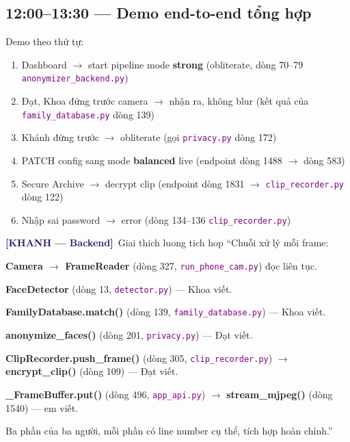 \documentclass[12pt, a4paper]{article}
\newcommand{\khanh}{\textcolor{MidnightBlue}{\textbf{[KHANH --- Backend]}}}
\newcommand{\fpath}[1]{\texttt{\textcolor{purple}{#1}}}
\begin{document}
\subsection{12:00--13:30 --- Demo end-to-end tổng hợp}

\begin{action}
Demo theo thứ tự:
\begin{enumerate}
  \item Dashboard $\to$ start pipeline mode \textbf{strong} (obliterate, dòng 70--79 \fpath{anonymizer\_backend.py})
  \item Đạt, Khoa đứng trước camera $\to$ nhận ra, không blur (kết quả của \fpath{family\_database.py} dòng 139)
  \item Khánh đứng trước $\to$ obliterate (gọi \fpath{privacy.py} dòng 172)
  \item PATCH config sang mode \textbf{balanced} live (endpoint dòng 1488 $\to$ dòng 583)
  \item Secure Archive $\to$ decrypt clip (endpoint dòng 1831 $\to$ \fpath{clip\_recorder.py} dòng 122)
  \item Nhập sai password $\to$ error (dòng 134--136 \fpath{clip\_recorder.py})
\end{enumerate}
\end{action}

\begin{dialog}{\khanh\ Giai thich luong tich hop}
``Chuỗi xử lý mỗi frame:

\textbf{Camera $\to$ FrameReader} (dòng 327, \fpath{run\_phone\_cam.py}) đọc liên tục.

\textbf{FaceDetector} (dòng 13, \fpath{detector.py}) --- Khoa viết.

\textbf{FamilyDatabase.match()} (dòng 139, \fpath{family\_database.py}) --- Khoa viết.

\textbf{anonymize\_faces()} (dòng 201, \fpath{privacy.py}) --- Đạt viết.

\textbf{ClipRecorder.push\_frame()} (dòng 305, \fpath{clip\_recorder.py}) $\to$ \textbf{encrypt\_clip()} (dòng 109) --- Đạt viết.

\textbf{\_FrameBuffer.put()} (dòng 496, \fpath{app\_api.py}) $\to$
\textbf{stream\_mjpeg()} (dòng 1540) --- em viết.

Ba phần của ba người, mỗi phần có line number cụ thể, tích hợp hoàn chỉnh.''
\end{dialog}

\end{document}
